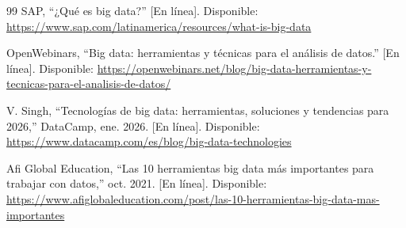 \documentclass[conference]{IEEEtran}
\begin{document}
\begin{thebibliography}{99}
SAP, ``¿Qué es big data?'' [En línea]. Disponible: \url{https://www.sap.com/latinamerica/resources/what-is-big-data}

OpenWebinars, ``Big data: herramientas y técnicas para el análisis de datos.'' [En línea]. Disponible: \url{https://openwebinars.net/blog/big-data-herramientas-y-tecnicas-para-el-analisis-de-datos/}

V. Singh, ``Tecnologías de big data: herramientas, soluciones y tendencias para 2026,'' DataCamp, ene. 2026. [En línea]. Disponible: \url{https://www.datacamp.com/es/blog/big-data-technologies}

Afi Global Education, ``Las 10 herramientas big data más importantes para trabajar con datos,'' oct. 2021. [En línea]. Disponible: \url{https://www.afiglobaleducation.com/post/las-10-herramientas-big-data-mas-importantes}

\end{thebibliography}
\end{document}
